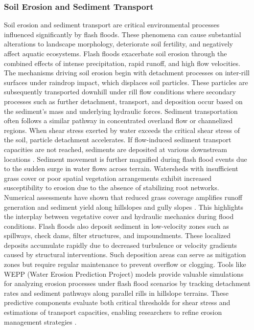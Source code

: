 \subsubsection{Soil Erosion and Sediment Transport}
Soil erosion and sediment transport are critical environmental processes influenced significantly by flash floods. These phenomena can cause substantial alterations to landscape morphology, deteriorate soil fertility, and negatively affect aquatic ecosystems. Flash floods exacerbate soil erosion through the combined effects of intense precipitation, rapid runoff, and high flow velocities. The mechanisms driving soil erosion begin with detachment processes on inter-rill surfaces under raindrop impact, which displaces soil particles. These particles are subsequently transported downhill under rill flow conditions where secondary processes such as further detachment, transport, and deposition occur based on the sediment's mass and underlying hydraulic forces. Sediment transportation often follows a similar pathway in concentrated overland flow or channelized regions. When shear stress exerted by water exceeds the critical shear stress of the soil, particle detachment accelerates. If flow-induced sediment transport capacities are not reached, sediments are deposited at various downstream locations \citep{Beilicci2024}.
Sediment movement is further magnified during flash flood events due to the sudden surge in water flows across terrain. Watersheds with insufficient grass cover or poor spatial vegetation arrangements exhibit increased susceptibility to erosion due to the absence of stabilizing root networks. Numerical assessments have shown that reduced grass coverage amplifies runoff generation and sediment yield along hillslopes and gully slopes \citep{Wang2023}. This highlights the interplay between vegetative cover and hydraulic mechanics during flood conditions.
Flash floods also deposit sediment in low-velocity zones such as spillways, check dams, filter structures, and impoundments. These localized deposits accumulate rapidly due to decreased turbulence or velocity gradients caused by structural interventions. Such deposition areas can serve as mitigation zones but require regular maintenance to prevent overflow or clogging. Tools like WEPP (Water Erosion Prediction Project) models provide valuable simulations for analyzing erosion processes under flash flood scenarios by tracking detachment rates and sediment pathways along parallel rills in hillslope terrains. These predictive components evaluate both critical thresholds for shear stress and estimations of transport capacities, enabling researchers to refine erosion management strategies \citep{Beilicci2024}.
